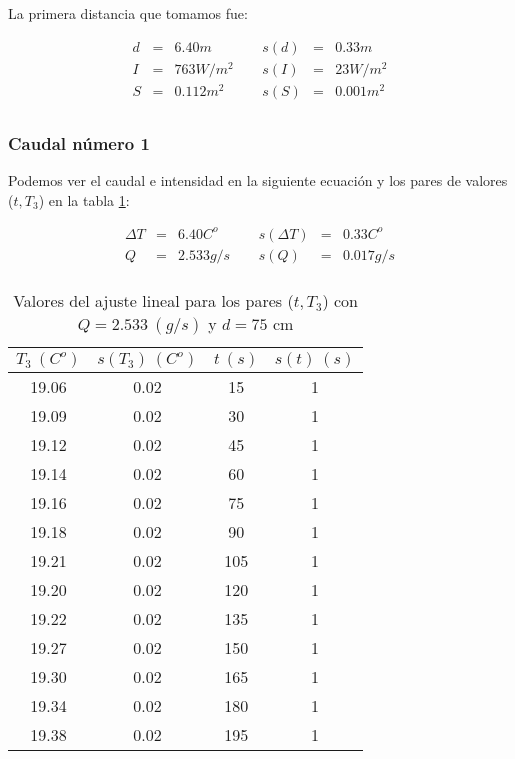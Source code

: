 \documentclass[12pt,a4paper]{article}
\begin{document}
La primera distancia que tomamos fue: 
 
\begin{equation} 
\begin{array}{lllllll}
d & = & 6.40 m &  \ \ &  s(d) & =  & 0.33  m \\ 
 I & = & 763 W/m^2 &  \ \ &  s(I) & =  & 23 W/m^2 \\ 
 S & = & 0.112 m^2 &  \ \ &  s(S) & =  & 0.001  m^2 \\ 
 \end{array} 
\end{equation} 
 
 \subsubsection{Caudal número 1} \label{subsec:1} 
 
Podemos ver el caudal e intensidad en la siguiente ecuación y los pares de valores ($t,T_3$) en la tabla \ref{tab:datoscrudos0}: 
 
\begin{equation} 
\begin{array}{lllllll}
\Delta T & = & 6.40 C^o &  \ \ &  s(\Delta T) & =  & 0.33  C^o \\ 
 Q & = & 2.533 g/s &  \ \ &  s(Q) & =  & 0.017  g/s \\ 
 \end{array} 
\end{equation} 
 
 \begin{table}[h!] 	 \centering 
\begin{tabular}{|c|c|c|c|} 
\hline 
$T_3 \ (C^o)$ & $s(T_3) \ (C^o)$ & $ t \ (s)$ & $s(t) \ (s)$  \\ \hline 
19.06  & 0.02 &  15 & 1 \\ 
\hline
19.09  & 0.02 &  30 & 1 \\ 
\hline
19.12  & 0.02 &  45 & 1 \\ 
\hline
19.14  & 0.02 &  60 & 1 \\ 
\hline
19.16  & 0.02 &  75 & 1 \\ 
\hline
19.18  & 0.02 &  90 & 1 \\ 
\hline
19.21  & 0.02 &  105 & 1 \\ 
\hline
19.20  & 0.02 &  120 & 1 \\ 
\hline
19.22  & 0.02 &  135 & 1 \\ 
\hline
19.27  & 0.02 &  150 & 1 \\ 
\hline
19.30  & 0.02 &  165 & 1 \\ 
\hline
19.34  & 0.02 &  180 & 1 \\ 
\hline
19.38  & 0.02 &  195 & 1 \\ 
\hline
\end{tabular} 
\caption{Valores del ajuste lineal para los pares ($t,T_3$) con $Q=2.533 \ (g/s)$ y $d= 75 $ cm} 
\label{tab:datoscrudos0} 
\end{table} 
 
\end{document}
